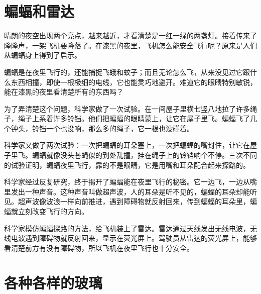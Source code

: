 \documentclass[12pt,UTF-8,openany]{ctexbook}
\begin{document}
\chapter{蝙蝠和雷达}

\begin{large}
    
    晴朗的夜空出现两个亮点，越来越近，才看清楚是一红一绿的两盏灯。接着传来了隆隆声，一架飞机要降落了。在漆黑的夜里，飞机怎么能安全飞行呢？原来是人们从蝙蝠身上得到了启示。
    
    蝙蝠是在夜里飞行的，还能捕捉飞蛾和蚊子；而且无论怎么飞，从来没见过它跟什么东西相撞，即使一根极细的电线，它也能灵巧地避开。难道它的眼睛特别敏锐，能在漆黑的夜里看清楚所有的东西吗？
    
    为了弄清楚这个问题，科学家做了一次试验。在一间屋子里横七竖八地拉了许多绳子，绳子上系着许多铃铛。他们把蝙蝠的眼睛蒙上，让它在屋子里飞。蝙蝠飞了几个钟头，铃铛一个也没响，那么多的绳子，它一根也没碰着。
    
    科学家又做了两次试验：一次把蝙蝠的耳朵塞上，一次把蝙蝠的嘴封住，让它在屋子里飞。蝙蝠就像没头苍蝇似的到处乱撞，挂在绳子上的铃铛响个不停。三次不同的试验证明，蝙蝠夜里飞行，靠的不是眼睛，它是用嘴和耳朵配合起来探路的。
    
    科学家经过反复研究，终于揭开了蝙蝠能在夜里飞行的秘密。它一边飞，一边从嘴里发出一种声音。这种声音叫做超声波，人的耳朵是听不见的，蝙蝠的耳朵却能听见。超声波像波浪一样向前推进，遇到障碍物就反射回来，传到蝙蝠的耳朵里，蝙蝠就立刻改变飞行的方向。
    
    科学家模仿蝙蝠探路的方法，给飞机装上了雷达。雷达通过天线发出无线电波，无线电波遇到障碍物就反射回来，显示在荧光屏上。驾驶员从雷达的荧光屏上，能够看清楚前方有没有障碍物，所以飞机在夜里飞行也十分安全。
    
\end{large}



\chapter{各种各样的玻璃}
\end{document}

